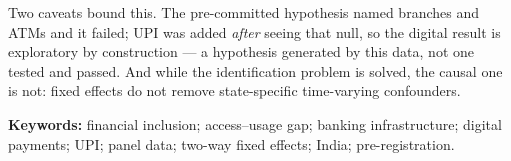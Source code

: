 Two caveats bound this. The pre-committed hypothesis named branches and ATMs and it failed; UPI was
added \emph{after} seeing that null, so the digital result is exploratory by construction --- a
hypothesis generated by this data, not one tested and passed. And while the identification problem
is solved, the causal one is not: fixed effects do not remove state-specific time-varying
confounders.

\vspace{0.8em}
\noindent\textbf{Keywords:} financial inclusion; access--usage gap; banking infrastructure; digital
payments; UPI; panel data; two-way fixed effects; India; pre-registration.
